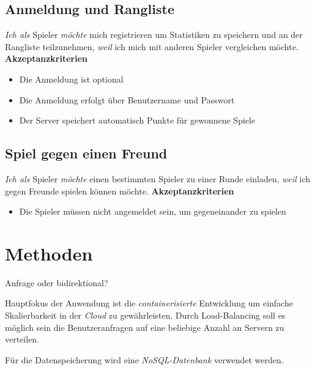\documentclass[conference]{IEEEtran}
\begin{document}
\subsection{Anmeldung und Rangliste}
\textit{Ich als} Spieler
\textit{möchte} mich registrieren um Statistiken zu speichern und an der Rangliste teilzunehmen,
\textit{weil} ich mich mit anderen Spieler vergleichen möchte.
\newline
\textbf{Akzeptanzkriterien}
\begin{itemize}
    \item Die Anmeldung ist optional
    \item Die Anmeldung erfolgt über Benutzername und Passwort
    \item Der Server speichert automatisch Punkte für gewonnene Spiele
\end{itemize}

\subsection{Spiel gegen einen Freund}
\textit{Ich als} Spieler
\textit{möchte} einen bestimmten Spieler zu einer Runde einladen,
\textit{weil} ich gegen Freunde spielen können möchte.
\newline
\textbf{Akzeptanzkriterien}
\begin{itemize}
    \item Die Spieler müssen nicht angemeldet sein, um gegeneinander zu spielen
\end{itemize}

\section{Methoden}
Anfrage oder bidirektional?


Hauptfokus der Anwendung ist die \textit{containerisierte} Entwicklung um einfache Skalierbarkeit in der \textit{Cloud} zu gewährleisten. Durch Load-Balancing soll es möglich sein die Benutzeranfragen auf eine beliebige Anzahl an Servern zu verteilen. 

Für die Datenspeicherung wird eine \textit{NoSQL-Datenbank} verwendet werden.
\end{document}
